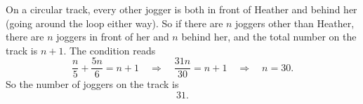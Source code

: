 On a circular track, every other jogger is both in front of Heather and behind her (going around the loop either way). So if there are $n$ joggers other than Heather, there are $n$ joggers in front of her and $n$ behind her, and the total number on the track is $n+1$. The condition reads
\[\dfrac{n}{5}+\dfrac{5n}{6}=n+1\quad\Longrightarrow\quad \dfrac{31n}{30}=n+1\quad\Longrightarrow\quad n=30.\]
So the number of joggers on the track is
\[\boxed{31}.\]
